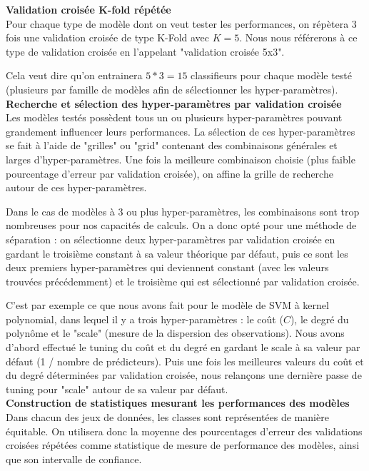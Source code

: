 \documentclass{article}
\begin{document}
\textbf{Validation croisée K-fold répétée}\\

Pour chaque type de modèle dont on veut tester les performances, on répètera 3 fois une validation croisée de type K-Fold avec $K=5$. Nous nous référerons à ce type de validation croisée en l'appelant "validation croisée 5x3".

Cela veut dire qu'on entrainera $5*3=15$ classifieurs pour chaque modèle testé (plusieurs par famille de modèles afin de sélectionner les hyper-paramètres).\\

\textbf{Recherche et sélection des hyper-paramètres par validation croisée}\\

Les modèles testés possèdent tous un ou plusieurs hyper-paramètres pouvant grandement influencer leurs performances. La sélection de ces hyper-paramètres se fait à l'aide de "grilles" ou "grid" contenant des combinaisons générales et larges d'hyper-paramètres. Une fois la meilleure combinaison choisie (plus faible pourcentage d'erreur par validation croisée), on affine la grille de recherche autour de ces hyper-paramètres.

Dans le cas de modèles à 3 ou plus hyper-paramètres, les combinaisons sont trop nombreuses pour nos capacités de calculs. On a donc opté pour une méthode de séparation : on sélectionne deux hyper-paramètres par validation croisée en gardant le troisième constant à sa valeur théorique par défaut, puis ce sont les deux premiers hyper-paramètres qui deviennent constant (avec les valeurs trouvées précédemment) et le troisième qui est sélectionné par validation croisée.

C'est par exemple ce que nous avons fait pour le modèle de SVM à kernel polynomial, dans lequel il y a trois hyper-paramètres : le coût ($C$), le degré du polynôme et le "scale" (mesure de la dispersion des observations). Nous avons d'abord effectué le tuning du coût et du degré en gardant le scale à sa valeur par défaut (1 / nombre de prédicteurs). Puis une fois les meilleures valeurs du coût et du degré déterminées par validation croisée, nous relançons une dernière passe de tuning pour "scale" autour de sa valeur par défaut.\\

\textbf{Construction de statistiques mesurant les performances des modèles}\\

Dans chacun des jeux de données, les classes sont représentées de manière équitable. On utilisera donc la moyenne des pourcentages d'erreur des validations croisées répétées comme statistique de mesure de performance des modèles, ainsi que son intervalle de confiance.
\end{document}
